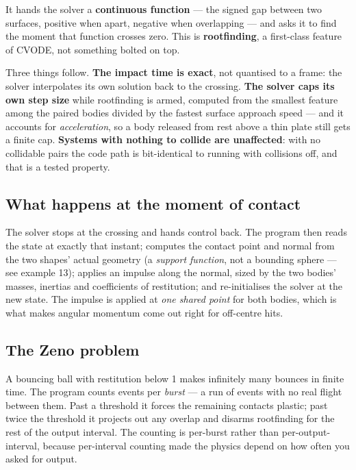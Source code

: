 \documentclass[11pt]{article}
\begin{document}
It hands the solver a \textbf{continuous function} --- the signed gap
between two surfaces, positive when apart, negative when overlapping ---
and asks it to find the moment that function crosses zero. This is
\textbf{rootfinding}, a first-class feature of CVODE, not something
bolted on top.

Three things follow. \textbf{The impact time is exact}, not quantised to
a frame: the solver interpolates its own solution back to the crossing.
\textbf{The solver caps its own step size} while rootfinding is armed,
computed from the smallest feature among the paired bodies divided by
the fastest surface approach speed --- and it accounts for
\emph{acceleration}, so a body released from rest above a thin plate
still gets a finite cap. \textbf{Systems with nothing to collide are
unaffected}: with no collidable pairs the code path is bit-identical to
running with collisions off, and that is a tested property.

\subsection{What happens at the moment of contact}

The solver stops at the crossing and hands control back. The program
then reads the state at exactly that instant; computes the contact point
and normal from the two shapes' actual geometry (a \emph{support
function}, not a bounding sphere --- see example 13); applies an impulse
along the normal, sized by the two bodies' masses, inertias and
coefficients of restitution; and re-initialises the solver at the new
state. The impulse is applied at \emph{one shared point} for both
bodies, which is what makes angular momentum come out right for
off-centre hits.

\subsection{The Zeno problem}

A bouncing ball with restitution below 1 makes infinitely many bounces
in finite time. The program counts events per \emph{burst} --- a run of
events with no real flight between them. Past a threshold it forces the
remaining contacts plastic; past twice the threshold it projects out any
overlap and disarms rootfinding for the rest of the output interval. The
counting is per-burst rather than per-output-interval, because
per-interval counting made the physics depend on how often you asked for
output.
\end{document}
